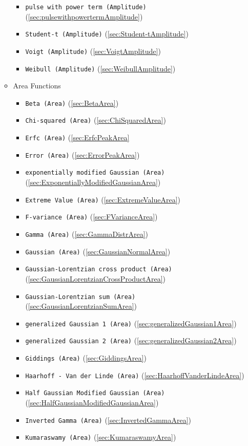 \begin{itemize}
\begin{itemize}
\begin{itemize}
    \item \texttt{pulse with power term (Amplitude)}  (\ref{sec:pulsewithpowertermAmplitude})
    \item \texttt{Student-t (Amplitude)} (\ref{sec:Student-tAmplitude})
    \item \texttt{Voigt (Amplitude)} (\ref{sec:VoigtAmplitude})
    \item \texttt{Weibull (Amplitude)} (\ref{sec:WeibullAmplitude})
  \end{itemize}
  \item Area Functions
  \begin{itemize}
    \item \texttt{Beta (Area)} (\ref{sec:BetaArea})
    \item \texttt{Chi-squared (Area)} (\ref{sec:ChiSquaredArea})
    \item \texttt{Erfc (Area)} (\ref{sec:ErfcPeakArea}
    \item \texttt{Error (Area)} (\ref{sec:ErrorPeakArea})
    \item \texttt{exponentially modified Gaussian (Area)} (\ref{sec:ExponentiallyModifiedGaussianArea})
    \item \texttt{Extreme Value (Area)} (\ref{sec:ExtremeValueArea})
    \item \texttt{F-variance (Area)} (\ref{sec:FVarianceArea})
    \item \texttt{Gamma (Area)} (\ref{sec:GammaDistrArea})
    \item \texttt{Gaussian (Area)} (\ref{sec:GaussianNormalArea})
    \item \texttt{Gaussian-Lorentzian cross product (Area)} (\ref{sec:GaussianLorentzianCrossProductArea})
    \item \texttt{Gaussian-Lorentzian sum (Area)} (\ref{sec:GaussianLorentzianSumArea})
    \item \texttt{generalized Gaussian 1 (Area)} (\ref{sec:generalizedGaussian1Area})
    \item \texttt{generalized Gaussian 2 (Area)} (\ref{sec:generalizedGaussian2Area})
    \item \texttt{Giddings (Area)} (\ref{sec:GiddingsArea})
    \item \texttt{Haarhoff - Van der Linde (Area)} (\ref{sec:HaarhoffVanderLindeArea})
    \item \texttt{Half Gaussian Modified Gaussian (Area)} (\ref{sec:HalfGaussianModifiedGaussianArea})
    \item \texttt{Inverted Gamma (Area)} (\ref{sec:InvertedGammaArea})
    \item \texttt{Kumaraswamy (Area)} (\ref{sec:KumaraswamyArea})

\end{itemize}
\end{itemize}
\end{itemize}
